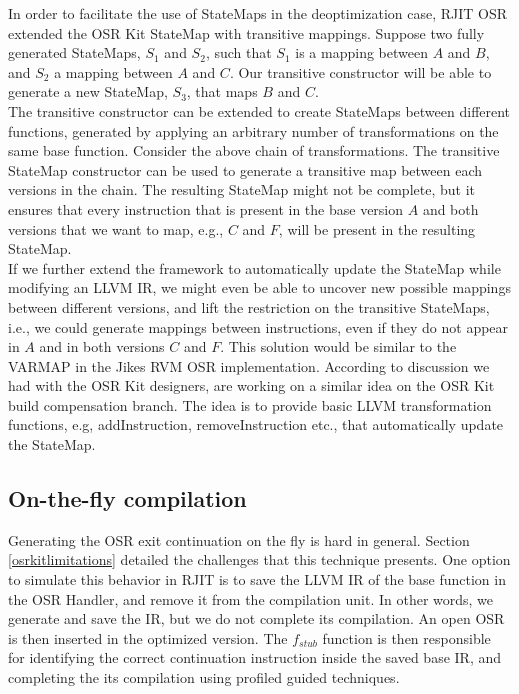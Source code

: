 In order to facilitate the use of StateMaps in the deoptimization case, RJIT OSR extended the OSR Kit\cite{OSRKit} StateMap with transitive mappings.
Suppose two fully generated StateMaps, $S_1$ and $S_2$, such that $S_1$ is a mapping between $A$ and $B$, and $S_2$ a mapping between $A$ and $C$.
Our transitive constructor will be able to generate a new StateMap, $S_3$, that maps $B$ and $C$.\\

The transitive constructor can be extended to create StateMaps between different functions, generated by applying an arbitrary number of transformations on the same base function.
Consider the above chain of transformations.
The transitive StateMap constructor can be used to generate a transitive map between each versions in the chain.
The resulting StateMap might not be complete, but it ensures that every instruction that is present in the base version $A$ and both versions that we want to map, e.g., $C$ and $F$, will be present in the resulting StateMap.\\

If we further extend the framework to automatically update the StateMap while modifying an LLVM IR, we might even be able to uncover new possible mappings between different versions, and lift the restriction on the transitive StateMaps, i.e., we could generate mappings between instructions, even if they do not appear in $A$ and in both versions $C$ and $F$.
This solution would be similar to the VARMAP in the Jikes RVM OSR implementation\cite{soman2006efficient}.
According to discussion we had with the OSR Kit designers,  are working on a similar idea on the OSR Kit build compensation branch\cite{OSRKitGit}.
The idea is to provide basic LLVM transformation functions, e.g, addInstruction, removeInstruction etc., that automatically update the StateMap.\\

\subsection{On-the-fly compilation}

Generating the OSR exit continuation on the fly is hard in general. 
Section \ref{osrkitlimitations} detailed the challenges that this technique presents.
One option to simulate this behavior in RJIT is to save the LLVM IR of the base function in the OSR Handler, and remove it from the compilation unit.
In other words, we generate and save the IR, but we do not complete its compilation.
An open OSR is then inserted in the optimized version. 
The $f_{stub}$ function is then responsible for identifying the correct continuation instruction inside the saved base IR, and completing the its compilation using profiled guided techniques.\\

